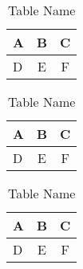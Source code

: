 \documentclass[12pt, a4paper]{report}
\begin{document}
\begin{table}
\centering
\caption{Table Name}
\begin{tabular}{|>{\raggedright}p{}|c|c|}
\hline
A & B & C \\
\hline
D & E & F \\
\hline
\end{tabular}
\end{table}
\begin{table}
\centering
\caption{Table Name}
\begin{tabular}{|>{\raggedleft}p{}|c|c|}
\hline
A & B & C \\
\hline
D & E & F \\
\hline
\end{tabular}
\end{table}
\begin{table}
\centering
\caption{Table Name}
\begin{tabular}{|>{\centering}p{}|c|c|}
\hline
A & B & C \\
\hline
D & E & F \\
\hline
\end{tabular}
\end{table}
\end{document}
